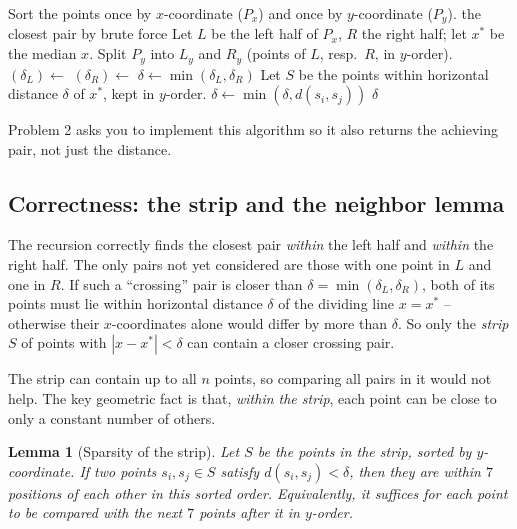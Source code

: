 \documentclass[11pt]{article}
\newtheorem{lemma}[theorem]{Lemma}
\begin{document}
\begin{algorithm}[h]
\caption{Closest-Pair (divide and conquer)}
\begin{algorithmic}[1]
\State Sort the points once by $x$-coordinate ($P_x$) and once by $y$-coordinate ($P_y$).
        \State \Return the closest pair by brute force
    \EndIf
    \State Let $L$ be the left half of $P_x$, $R$ the right half; let $x^*$ be the median $x$.
    \State Split $P_y$ into $L_y$ and $R_y$ (points of $L$, resp.\ $R$, in $y$-order).
    \State $(\delta_L) \gets$ 
    \State $(\delta_R) \gets$ 
    \State $\delta \gets \min(\delta_L, \delta_R)$
    \State Let $S$ be the points within horizontal distance $\delta$ of $x^*$, kept in $y$-order.
            \State $\delta \gets \min(\delta, d(s_i, s_j))$
        \EndFor
    \EndFor
    \State \Return $\delta$
\EndFunction
\end{algorithmic}
\end{algorithm}

Problem 2 asks you to implement this algorithm so it also returns the achieving pair, not
just the distance.

\subsection{Correctness: the strip and the neighbor lemma}

The recursion correctly finds the closest pair \emph{within} the left half and \emph{within}
the right half. The only pairs not yet considered are those with one point in $L$ and one in
$R$. If such a ``crossing'' pair is closer than $\delta = \min(\delta_L, \delta_R)$, both of
its points must lie within horizontal distance $\delta$ of the dividing line $x = x^*$ --
otherwise their $x$-coordinates alone would differ by more than $\delta$. So only the
\emph{strip} $S$ of points with $|x - x^*| < \delta$ can contain a closer crossing pair.

The strip can contain up to all $n$ points, so comparing all pairs in it would not help.
The key geometric fact is that, \emph{within the strip}, each point can be close to only a
constant number of others.

\begin{lemma}[Sparsity of the strip]
\label{lem:strip}
Let $S$ be the points in the strip, sorted by $y$-coordinate. If two points $s_i, s_j \in S$
satisfy $d(s_i, s_j) < \delta$, then they are within $7$ positions of each other in this
sorted order. Equivalently, it suffices for each point to be compared with the next $7$
points after it in $y$-order.
\end{lemma}
\end{document}
